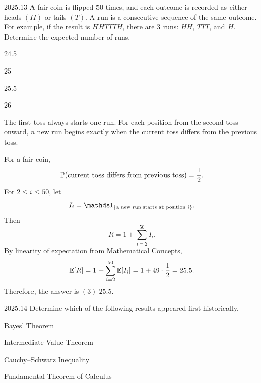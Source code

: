     \begin{pastproblem}{2025.13}
        A fair coin is flipped $50$ times, and each outcome is recorded as either heads $(H)$ or
        tails $(T)$. A run is a consecutive sequence of the same outcome. For example, if the
        result is
        $HHTTTH$, there are $3$ runs: $HH$, $TTT$, and $H$. Determine the expected number of runs.
        \begin{problemchoices}
            \item 24.5
            \item 25
            \item 25.5
            \item 26
        \end{problemchoices}
    \end{pastproblem}

    \begin{solution}
        The first toss always starts one run. For each position from the second toss onward, a new
        run begins exactly when the current toss differs from the previous toss.

        For a fair coin,
        \[
            \mathbb{P}(\text{current toss differs from previous toss})=\frac12.
        \]
        For $2\leq i\leq50$, let
        \[
            I_i
            =
            \indicator{\{\text{a new run starts at position }i\}}.
        \]
        Then
        \[
            R=1+\sum_{i=2}^{50}I_i.
        \]
        By linearity of expectation from Mathematical Concepts,
        \[
            \mathbb{E}[R]
            =
            1+\sum_{i=2}^{50}\mathbb{E}[I_i]
            =
            1+49\cdot\frac12
            =
            25.5.
        \]
        Therefore, the answer is $\boxed{(3)\ 25.5}$.
    \end{solution}

    \begin{pastproblem}{2025.14}
        Determine which of the following results appeared first historically.
        \begin{problemchoices}
            \item Bayes' Theorem
            \item Intermediate Value Theorem
            \item Cauchy--Schwarz Inequality
            \item Fundamental Theorem of Calculus
        \end{problemchoices}
    \end{pastproblem}

